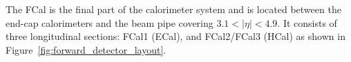 







The FCal is the final part of the calorimeter system and is located between the end-cap calorimeters and the beam pipe covering $3.1 < |\eta| < 4.9$. It consists of three longitudinal sections: FCal1 (ECal), and FCal2/FCal3 (HCal) as shown in Figure~\ref{fig:forward_detector_layout}. 

